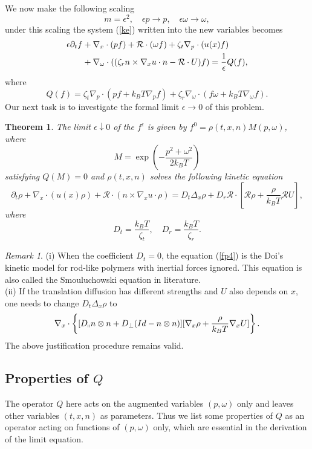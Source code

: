 \documentclass[reqno]{amsart}
\numberwithin{equation}{section}
\newtheorem{Theorem}{Theorem}[section]
\theoremstyle{definition}
\theoremstyle{remark}
\newtheorem{Remark}{Remark}[section]
\begin{document}
We now make the following scaling
$$
m=\epsilon^2, \quad \epsilon p \to p, \quad \epsilon \omega \to
\omega,
$$
under this scaling the system (\ref{ke}) written into the new
variables becomes
\begin{align} \label{ske}
\epsilon \partial_t f &+\nabla_x \cdot(pf)+ \mathcal{R}\cdot(\omega f)+ \zeta_t
\nabla_p \cdot(u(x) f)\notag \\
\quad & + \nabla_\omega \cdot((\zeta_r n\times \nabla_xu \cdot
n-\mathcal{R}\cdot U) f)=\frac{1}{\epsilon}Q(f),
\end{align}
where
$$
Q(f)=\zeta_t \nabla_p\cdot(pf+k_BT \nabla_p f)+\zeta_r \nabla_\omega
\cdot(f\omega +k_BT \nabla_\omega f).
$$
Our next task is to investigate the formal limit $\epsilon \to 0$ of this problem.
\begin{Theorem}
The limit $\epsilon \downarrow 0$ of the $f^\epsilon$ is given by $f^0=\rho(t, x, n)M(p,\omega)$, where
\begin{equation}\label{m_rod}
M=\exp\left(-\frac{p^2+\omega^2}{2k_BT}\right)
\end{equation}
satisfying $Q(M)=0$ and $\rho(t, x, n)$ solves the following kinetic equation
\begin{equation}\label{fp4}
  \partial_t \rho +\nabla_x\cdot(u(x)\rho) +\mathcal{R}\cdot(n\times \nabla_xu \cdot \rho)=D_t\Delta_x \rho +D_r \mathcal{R}\cdot \left[\mathcal{R}\rho +\frac{\rho}{k_B T}\mathcal{R}U \right],
\end{equation}
where
$$
D_t=\frac{k_BT}{\zeta_t}, \quad D_r=\frac{k_BT}{\zeta_r}.
$$
\end{Theorem}
\begin{Remark}
(i)
When the coefficient $D_t=0$, the equation (\ref{fp4}) is the Doi's
kinetic model for rod-like polymers with inertial forces ignored.
This equation is also called the Smouluchowski equation in literature. \\
(ii) If the translation diffusion has different strengths and $U$ also depends on $x$, one needs to change
$D_t\Delta_x \rho$ to
$$
\nabla_x\cdot\left\{[D_{\shortparallel}n\otimes n+D_{\perp}(Id-n\otimes n)]
[\nabla_x \rho +\frac{\rho}{k_BT}\nabla_x U]
\right\}.
$$
The above justification procedure remains valid.
\end{Remark}
\subsection{Properties of $Q$}
The operator $Q$ here acts on the augmented variables $(p, \omega)$
only and leaves other variables $(t, x, n)$ as parameters. Thus we
list some properties of $Q$ as an operator acting on functions of
$(p, \omega)$ only, which are essential in the derivation of the
limit equation.
\end{document}
